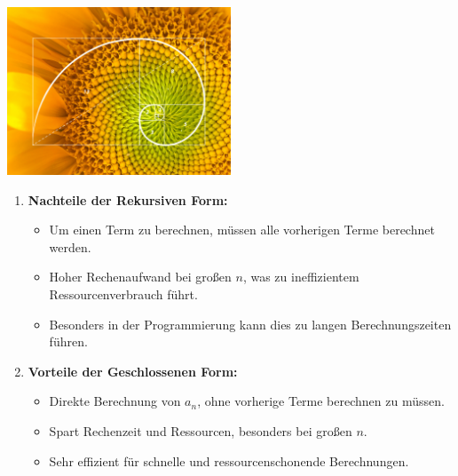 \documentclass{beamer}
\begin{document}
\begin{frame}
    \begin{center}
           \includegraphics[width=0.5\textwidth]{sonnenblum.png}
    \end{center}
     \vspace{1em}

\end{frame}


\begin{frame}
    \begin{enumerate}
        \item \textbf{Nachteile der Rekursiven Form:}
        \begin{itemize}
            \item Um einen Term zu berechnen, müssen alle vorherigen Terme berechnet werden.
            \item Hoher Rechenaufwand bei großen \( n \), was zu ineffizientem Ressourcenverbrauch führt.
            \item Besonders in der Programmierung kann dies zu langen Berechnungszeiten führen.
        \end{itemize}
        
        \item \textbf{Vorteile der Geschlossenen Form:}
        \begin{itemize}
            \item Direkte Berechnung von \( a_n \), ohne vorherige Terme berechnen zu müssen.
            \item Spart Rechenzeit und Ressourcen, besonders bei großen \( n \).
            \item Sehr effizient für schnelle und ressourcenschonende Berechnungen.
        \end{itemize}
    \end{enumerate}
\end{frame}
\end{document}
